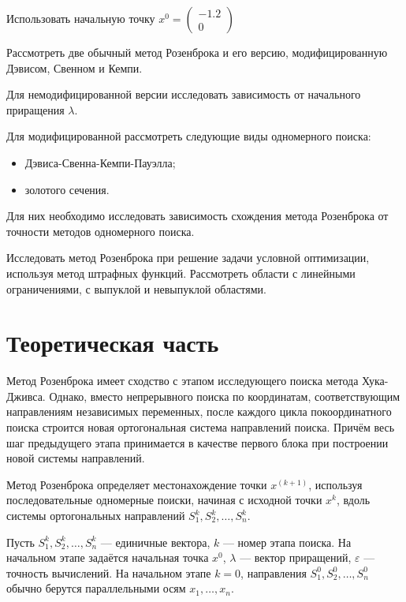 \documentclass[a4paper,12pt,notitlepage,pdftex,headsepline]{scrartcl}
\begin{document}
  Использовать начальную точку $x^0 = \left(\begin{matrix}-1.2 \\
    0\end{matrix}\right)$

  Рассмотреть две обычный метод Розенброка и его версию, модифицированную
  Дэвисом, Свенном и Кемпи.

  Для немодифицированной версии исследовать зависимость от начального
  приращения $\lambda$.

  Для модифицированной рассмотреть следующие виды одномерного поиска:
  \begin{itemize}
    \item Дэвиса-Свенна-Кемпи-Пауэлла;
    \item золотого сечения.
  \end{itemize}
  Для них необходимо исследовать зависимость схождения метода Розенброка от
  точности методов одномерного поиска.

  Исследовать метод Розенброка при решение задачи условной оптимизации,
  используя метод штрафных функций.
  Рассмотреть области с линейными ограничениями, с выпуклой и невыпуклой
  областями.

  \clearpage

\section{Теоретическая часть}
  Метод Розенброка имеет сходство с этапом исследующего поиска метода
  Хука-Дживса.
  Однако, вместо непрерывного поиска по координатам, соответствующим
  направлениям независимых переменных, после каждого цикла покоординатного
  поиска строится новая ортогональная система направлений поиска.
  Причём весь шаг предыдущего этапа принимается в качестве первого блока при
  построении новой системы направлений.

  Метод Розенброка определяет местонахождение точки $x^{\left(k+1\right)}$,
  используя последовательные одномерные поиски, начиная с исходной точки
  $x^k$, вдоль системы ортогональных направлений $S_1^k, S_2^k, \dots, S_n^k$.

  Пусть $S_1^k, S_2^k, \dots, S_n^k$ --- единичные вектора, $k$ --- номер
  этапа поиска.
  На начальном этапе задаётся начальная точка $x^0$, $\lambda$ --- вектор
  приращений, $\varepsilon$ --- точность вычислений.
  На начальном этапе $k = 0$, направления $S_1^0, S_2^0, \dots, S_n^0$ обычно
  берутся параллельными осям $x_1, \dots, x_n$.
\end{document}
